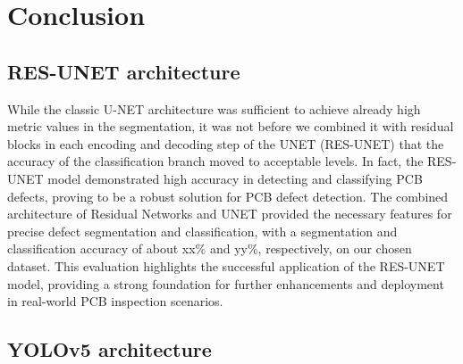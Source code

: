 \documentclass[12pt]{article}
\begin{document}
\clearpage
\newpage

\section{Conclusion}
\subsection{RES-UNET architecture}
While the classic U-NET architecture was sufficient to achieve already high metric values in the segmentation, it was not before we combined it with residual blocks in each encoding and decoding step of the UNET (RES-UNET) that the accuracy of the classification branch moved to acceptable levels. In fact, the RES-UNET model demonstrated high accuracy in detecting and classifying PCB defects, proving to be a robust solution for PCB defect detection. The combined architecture of Residual Networks and UNET provided the necessary features for precise defect segmentation and classification,  with a segmentation and classification accuracy of about xx\% and yy\%, respectively, on our chosen dataset. This evaluation highlights the successful application of the RES-UNET model, providing a strong foundation for further enhancements and deployment in real-world PCB inspection scenarios.

\subsection{YOLOv5 architecture}

\clearpage
\newpage
\end{document}
